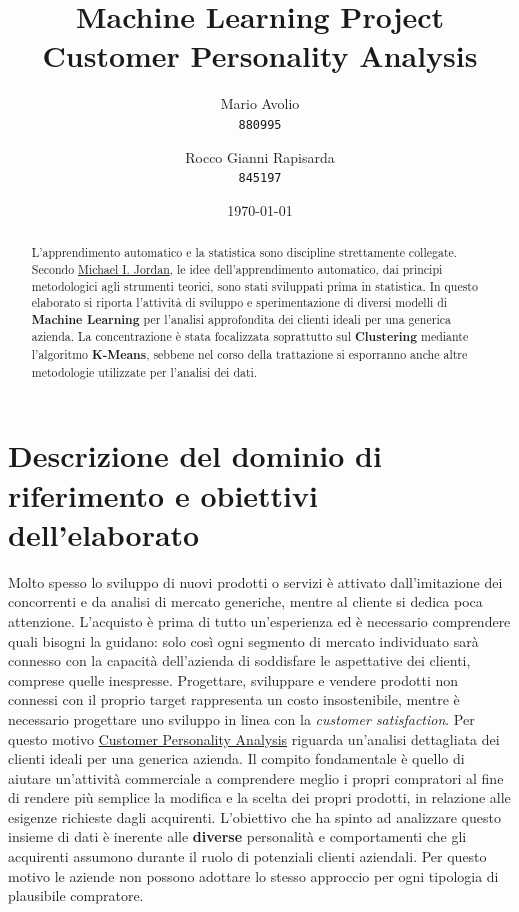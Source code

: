 \documentclass[letterpaper,11pt]{article}
\begin{document}
\title{Machine Learning Project \\\textbf{Customer Personality Analysis}}

\author{
  Mario Avolio\\
  \texttt{880995}
  \and
  Rocco Gianni Rapisarda\\
  \texttt{845197}
}
\date{\today}
\maketitle

\begin{abstract}
L'apprendimento automatico e la statistica sono discipline strettamente collegate. Secondo \href{https://en.wikipedia.org/wiki/Michael\_I.\_Jordan}{Michael I. Jordan}, le idee dell'apprendimento automatico, dai principi metodologici agli strumenti teorici, sono stati sviluppati prima in statistica. In questo elaborato si riporta l'attività di sviluppo e sperimentazione di diversi modelli di \textbf{Machine Learning} per l'analisi approfondita dei clienti ideali per una generica azienda. La concentrazione è stata focalizzata soprattutto sul \textbf{Clustering} mediante l'algoritmo \textbf{K-Means}, sebbene nel corso della trattazione si esporranno anche altre metodologie utilizzate per l'analisi dei dati.
\end{abstract}

\section{Descrizione del dominio di riferimento e obiettivi dell’elaborato}
Molto spesso lo sviluppo di nuovi prodotti o servizi è attivato dall’imitazione dei concorrenti e da analisi di mercato generiche, mentre al cliente si dedica poca attenzione. L’acquisto è prima di tutto un’esperienza ed è necessario comprendere quali bisogni la guidano: solo così ogni segmento di mercato individuato sarà connesso con la capacità dell’azienda di soddisfare le aspettative dei clienti, comprese quelle inespresse. Progettare, sviluppare e vendere prodotti non connessi con il proprio target rappresenta un costo insostenibile, mentre è necessario progettare uno sviluppo in linea con la \textit{customer satisfaction}. Per questo motivo \href{https://www.kaggle.com/imakash3011/customer-personality-analysis}{Customer Personality Analysis} riguarda un'analisi dettagliata dei clienti ideali per una generica azienda. Il compito fondamentale è quello di aiutare un'attività commerciale a comprendere meglio i propri compratori al fine di rendere più semplice la modifica e la scelta dei propri prodotti, in relazione alle esigenze richieste dagli acquirenti. L'obiettivo che ha spinto ad analizzare questo insieme di dati è inerente alle \textbf{diverse} personalità e comportamenti che gli acquirenti assumono durante il ruolo di potenziali clienti aziendali. Per questo motivo le aziende non possono adottare lo stesso approccio per ogni tipologia di plausibile compratore. 
\end{document}
